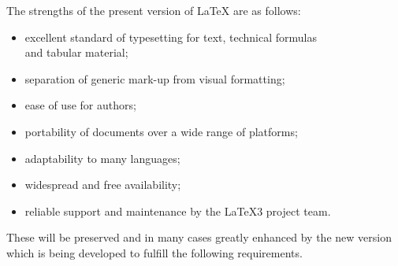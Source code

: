 \documentclass[a4paper]{article}
\begin{document}
The strengths of the present version of \LaTeX{} are
as follows:
 \begin{itemize}
 \item excellent standard of typesetting for text, technical 
formulas\\
and tabular material;
 \item  separation of generic mark-up from visual formatting;
 \item  ease of use for authors;
 \item  portability of documents over a wide range of platforms;
 \item  adaptability to many languages;
 \item  widespread and free availability;
 \item  reliable support and maintenance by the \LaTeX3 project team.
 \end{itemize}
 These will be preserved and in many cases greatly enhanced by the new
 version which is being developed to fulfill the following requirements.
\end{document}
